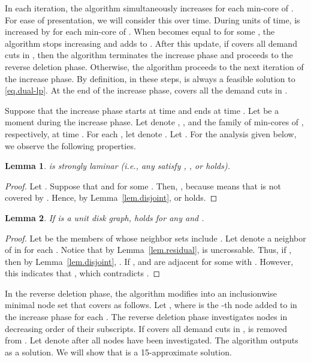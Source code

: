 \documentclass[11pt]{article}
\newtheorem{lemma}{Lemma}
\begin{document}
   In each iteration, the algorithm simultaneously increases  for each min-core
    of .
   For ease of presentation, we will consider this over time.
   During  units of time,  is increased by
    for each min-core  of .
   When  becomes equal to  for some ,
 the algorithm stops increasing 
 and adds  to .
After this update, if  covers all demand cuts in , then
the algorithm terminates the increase phase and proceeds to the
 reverse deletion phase.
 Otherwise, the algorithm proceeds to the next iteration of the increase
   phase.
 By definition, in these steps,  is always a feasible solution to
 \eqref{eq.dual-lp}.
 At the end of the increase phase,  covers all the demand cuts in .
 
 Suppose that the increase phase
 starts at time  and ends at time .
 Let  be a moment during the increase phase.
 Let  denote , ,
 and the family of min-cores of , respectively,
 at time .
 For each , let  denote .
 Let .
 For the analysis given below, we observe the following properties.


 
  \begin{lemma}
   \label{lem.stronglaminar}
   is strongly laminar (i.e., any  satisfy , , or  holds).
  \end{lemma}
\begin{proof}
 Let . Suppose that  and 
 for some .
 Then, , because  means that  is
 not covered by .
 Hence, by Lemma~\ref{lem.disjoint},  or  holds.
\end{proof}
 
  \begin{lemma}
   \label{lem.degree-udg}
   If  is a unit disk graph, 
    holds for any  and .
  \end{lemma}
 \begin{proof}
  Let
   be the
  members of  whose neighbor sets include
  .
  Let  denote
  a neighbor of  in  for each .
  Notice that by Lemma~\ref{lem.residual},  is uncrossable.
  Thus, if , then by Lemma~\ref{lem.disjoint}, .
  If ,
   and  are adjacent 
  for some  with .
  However,
  this indicates that , which contradicts .
  \end{proof}

  In the reverse deletion phase, the algorithm 
  modifies  into an inclusionwise minimal node set that covers  as follows.
  Let , where  is the -th node added to  
  in the increase phase
  for each .
  The reverse deletion phase investigates nodes  in decreasing order
  of their subscripts. If
   covers all demand cuts in ,
   is removed from .
  Let  denote  after all nodes have been investigated.
  The algorithm outputs  as a solution.
  We will show that  is a 15-approximate solution.
  
\end{document}
